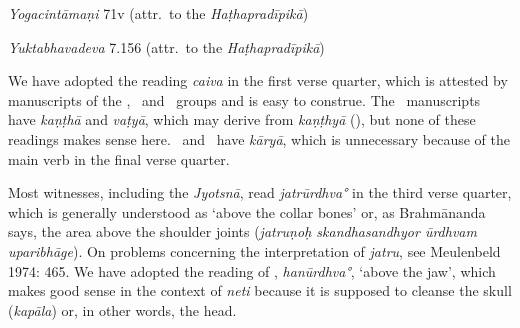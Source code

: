 \begin{ekdosis}
\begin{testimonia}[hp02_031]
\begin{versinnote}
\end{versinnote}

\emph{Yogacintāmaṇi} 71v (attr.~to the \emph{Haṭhapradīpikā})

\begin{versinnote}
\end{versinnote}

\emph{Yuktabhavadeva} 7.156 (attr.~to the \emph{Haṭhapradīpikā})

\begin{versinnote}
\end{versinnote}

\end{testimonia}

\begin{philcomm}[hp02_031]
We have adopted the reading \emph{caiva} in the first verse quarter, which is attested by manuscripts of the \textbeta, \textgamma\ and \textdelta\ groups and is easy to construe. The \textalpha\ manuscripts have \emph{kaṇṭhā} and \emph{vaṭyā}, which may derive from \emph{kaṇṭhyā} (\epsilonOne), but none of these readings makes sense here. \etaOne\ and \etaTwo\ have \emph{kāryā}, which is unnecessary because of the main verb in the final verse quarter.

Most witnesses, including the \emph{Jyotsnā}, read \emph{jatrūrdhva°} in the third verse quarter, which is generally understood as `above the collar bones' or, as Brahmānanda says, the area above the shoulder joints (\emph{jatruṇoḥ skandhasandhyor ūrdhvam uparibhāge}). On problems concerning the interpretation of \emph{jatru}, see Meulenbeld 1974: 465. We have adopted the reading of \textalpha, \emph{hanūrdhva°}, ‘above the jaw’, which makes good sense in the context of \emph{neti} because it is supposed to cleanse the skull (\emph{kapāla}) or, in other words, the head.


\end{philcomm}
\end{ekdosis}
